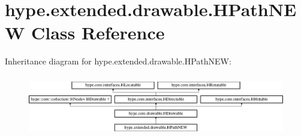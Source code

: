 \hypertarget{classhype_1_1extended_1_1drawable_1_1_h_path_n_e_w}{\section{hype.\-extended.\-drawable.\-H\-Path\-N\-E\-W Class Reference}
\label{classhype_1_1extended_1_1drawable_1_1_h_path_n_e_w}
}
Inheritance diagram for hype.\-extended.\-drawable.\-H\-Path\-N\-E\-W\-:\begin{figure}[H]
\begin{center}
\leavevmode
\includegraphics[height=2.745098cm]{classhype_1_1extended_1_1drawable_1_1_h_path_n_e_w}
\end{center}
\end{figure}
